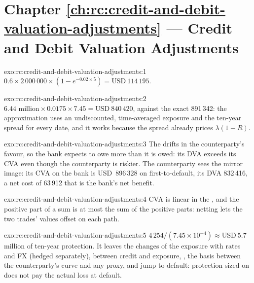 \section*{Chapter \ref{ch:rc:credit-and-debit-valuation-adjustments} --- Credit and Debit Valuation Adjustments}

\begin{solution}{exo:rc:credit-and-debit-valuation-adjustments:1}
$0.6\times2\,000\,000\times(1-e^{-0.02\times5}) = \text{USD}~114\,195$.
\end{solution}

\begin{solution}{exo:rc:credit-and-debit-valuation-adjustments:2}
$6.44\text{ million}\times0.0175\times7.45 = \text{USD}~840\,420$, against the exact 891\,342: the
approximation uses an undiscounted, time-averaged exposure and the ten-year spread for every
date, and it works because the spread already prices $\lambda(1-R)$.
\end{solution}

\begin{solution}{exo:rc:credit-and-debit-valuation-adjustments:3}
The  drifts in the counterparty's favour, so the bank expects to owe more than it
is owed: its DVA exceeds its CVA even though the counterparty is riskier. The counterparty sees
the mirror image: its CVA on the bank is USD~896\,328 on first-to-default, its DVA 832\,416, a
net cost of 63\,912 that is the bank's net benefit.
\end{solution}

\begin{solution}{exo:rc:credit-and-debit-valuation-adjustments:4}
CVA is linear in the , and the positive part of a sum is at most
the sum of the positive parts: netting lets the two trades' values offset on each path.
\end{solution}

\begin{solution}{exo:rc:credit-and-debit-valuation-adjustments:5}
$4\,254/(7.45\times10^{-4}) \approx \text{USD}~5.7$ million of ten-year protection. It leaves the
changes of the exposure with rates and FX (hedged separately),  between credit and
exposure, , the basis between the counterparty's curve and any proxy, and
jump-to-default: protection sized on  does not pay the actual loss at default.
\end{solution}

